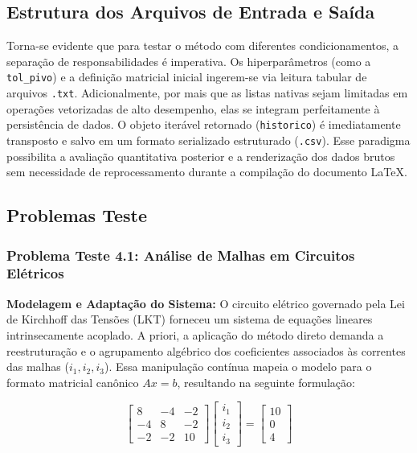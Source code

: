 \subsection{Estrutura dos Arquivos de Entrada e Saída}

Torna-se evidente que para testar o método com diferentes condicionamentos, a separação de responsabilidades é imperativa. Os hiperparâmetros (como a \texttt{tol\_pivo}) e a definição matricial inicial ingerem-se via leitura tabular de arquivos \texttt{.txt}. Adicionalmente, por mais que as listas nativas sejam limitadas em operações vetorizadas de alto desempenho, elas se integram perfeitamente à persistência de dados. O objeto iterável retornado (\texttt{historico}) é imediatamente transposto e salvo em um formato serializado estruturado (\texttt{.csv}). Esse paradigma possibilita a avaliação quantitativa posterior e a renderização dos dados brutos sem necessidade de reprocessamento durante a compilação do documento \LaTeX.

\subsection{Problemas Teste}

\subsubsection{Problema Teste 4.1: Análise de Malhas em Circuitos Elétricos}

\textbf{Modelagem e Adaptação do Sistema:} O circuito elétrico governado pela Lei de Kirchhoff das Tensões (LKT) forneceu um sistema de equações lineares intrinsecamente acoplado. A priori, a aplicação do método direto demanda a reestruturação e o agrupamento algébrico dos coeficientes associados às correntes das malhas ($i_1, i_2, i_3$). Essa manipulação contínua mapeia o modelo para o formato matricial canônico $Ax = b$, resultando na seguinte formulação:

\begin{equation}
    \begin{bmatrix}
        8 & -4 & -2 \\
        -4 & 8 & -2 \\
        -2 & -2 & 10
    \end{bmatrix}
    \begin{bmatrix}
        i_1 \\
        i_2 \\
        i_3
    \end{bmatrix}
    =
    \begin{bmatrix}
        10 \\
        0 \\
        4
    \end{bmatrix}
\end{equation}

